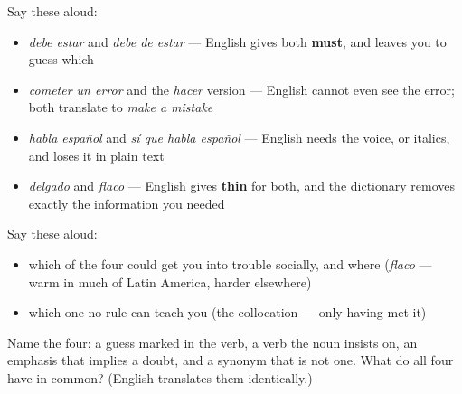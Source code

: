 Say these aloud:

\begin{itemize}
\raggedright
  \item \emph{debe estar} and \emph{debe de estar} — English gives both \textbf{must}, and leaves you to guess which
  \item \emph{cometer un error} and the \emph{hacer} version — English cannot even see the error; both translate to \emph{make a mistake}
  \item \emph{habla español} and \emph{sí que habla español} — English needs the voice, or italics, and loses it in plain text
  \item \emph{delgado} and \emph{flaco} — English gives \textbf{thin} for both, and the dictionary removes exactly the information you needed
\end{itemize}

Say these aloud:

\begin{itemize}
\raggedright
  \item which of the four could get you into trouble socially, and where (\emph{flaco} — warm in much of Latin America, harder elsewhere)
  \item which one no rule can teach you (the collocation — only having met it)
\end{itemize}

\begin{tcolorbox}[breakable,colback=teal!4,colframe=teal!35!black,title={Before you move on}]
Name the four: a guess marked in the verb, a verb the noun insists on, an emphasis that implies a doubt, and a synonym that is not one. What do all four have in common? (English translates them identically.)
\end{tcolorbox}
